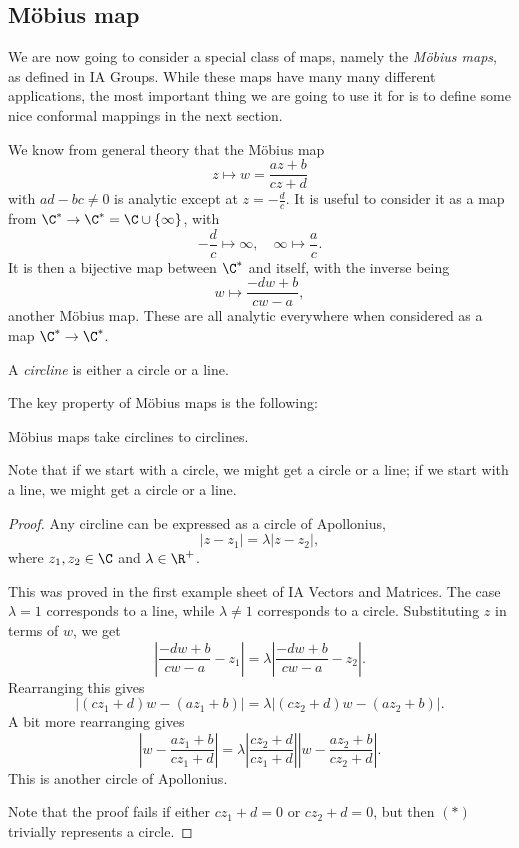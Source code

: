\documentclass[a4paper]{article}
\begin{document}
\subsection{M\"obius map}
We are now going to consider a special class of maps, namely the \emph{M\"obius maps}, as defined in IA Groups. While these maps have many many different applications, the most important thing we are going to use it for is to define some nice conformal mappings in the next section.

We know from general theory that the M\"obius map
\[
  z \mapsto w = \frac{az + b}{cz + d}
\]
with $ad - bc \not= 0$ is analytic except at $z = -\frac{d}{c}$. It is useful to consider it as a map from $\C^* \to \C^* = \C \cup \{\infty\}$, with
\[
  -\frac{d}{c} \mapsto \infty,\quad \infty \mapsto \frac{a}{c}.
\]
It is then a bijective map between $\C^*$ and itself, with the inverse being
\[
  w \mapsto \frac{-d w + b}{cw - a},
\]
another M\"obius map. These are all analytic everywhere when considered as a map $\C^* \to \C^*$.

\begin{defi}[Circline]
  A \emph{circline} is either a circle or a line.
\end{defi}

The key property of M\"obius maps is the following:
\begin{prop}
  M\"obius maps take circlines to circlines.
\end{prop}
Note that if we start with a circle, we might get a circle or a line; if we start with a line, we might get a circle or a line.

\begin{proof}
  Any circline can be expressed as a circle of Apollonius,
  \[
    |z - z_1| = \lambda |z - z_2|,
  \]
  where $z_1, z_2 \in \C$ and $\lambda \in \R^+$.

  This was proved in the first example sheet of IA Vectors and Matrices. The case $\lambda = 1$ corresponds to a line, while $\lambda \not= 1$ corresponds to a circle. Substituting $z$ in terms of $w$, we get
  \[
    \left|\frac{-dw + b}{cw - a} - z_1\right| = \lambda \left|\frac{-dw + b}{cw - a} - z_2 \right|.
  \]
  Rearranging this gives
  \[
    |(cz_1 + d) w - (az_1 + b)| = \lambda|(cz_2 + d)w - (az_2 + b)|.\tag{$*$}
  \]
  A bit more rearranging gives
  \[
    \left|w - \frac{az_1 + b}{cz_1 + d}\right| = \lambda \left|\frac{cz_2 + d}{cz_1 + d}\right|\left|w - \frac{az_2 + b}{cz_2 + d}\right|.
  \]
  This is another circle of Apollonius.

  Note that the proof fails if either $cz_1 + d = 0$ or $cz_2 + d = 0$, but then $(*)$ trivially represents a circle.
\end{proof}
\end{document}
